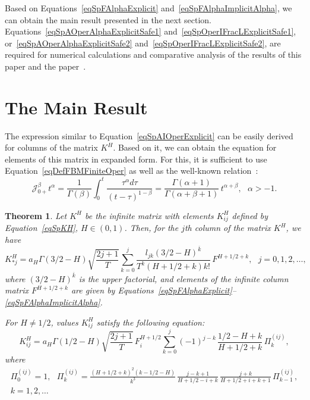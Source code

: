 \documentclass[10pt,reqno]{amsart}
\theoremstyle{plain}
\newtheorem{theorem}{Theorem}
\theoremstyle{remark}
\newcommand{\cj}{\mathcal{J}}
\begin{document}
Based on Equations~\eqref{eqSpFAlphaExplicit} and~\eqref{eqSpFAlphaImplicitAlpha}, we can obtain the main result presented in the next section. Equations~\eqref{eqSpAOperAlphaExplicitSafe1} and~\eqref{eqSpOperIFracLExplicitSafe1}, or~\eqref{eqSpAOperAlphaExplicitSafe2} and~\eqref{eqSpOperIFracLExplicitSafe2}, are required for numerical calculations and comparative analysis of the results of this paper and the paper~\cite{Ryb_Comp25}.



\section{The Main Result}\label{secMain}

The expression similar to Equation~\eqref{eqSpAIOperExplicit} can be easily derived for columns of the matrix $K^H$. Based on it, we can obtain the equation for elements of this matrix in expanded form. For this, it is sufficient to use Equation~\eqref{eqDefFBMFiniteOper} as well as the well-known relation~\cite{SamKilMar_87}:
\begin{equation}\label{eqFracInt}
  \cj_{0+}^\beta t^\alpha = \frac{1}{\Gamma(\beta)} \int_0^t {\frac{\tau^\alpha d\tau}{(t-\tau)^{1-\beta}}} = \frac{\Gamma(\alpha+1)}{\Gamma(\alpha+\beta+1)} \, t^{\alpha+\beta}, \ \ \ \alpha > -1.
\end{equation}

\begin{theorem}\label{thmMain}
Let $K^H$ be the infinite matrix with elements $K_{ij}^H$ defined by Equation~\eqref{eqSpKH}, $H \in (0,1)$. Then, for the $j$th column of the matrix $K^H$, we have
\begin{equation}\label{eqSpOperKHLExplicit}
  K_{*j}^H = a_H \Gamma(3/2-H) \sqrt{\frac{2j+1}{T}} \sum\limits_{k=0}^j \frac{l_{jk} (3/2-H)^{\overline{k}}}{T^k (H+1/2+k) k!} \, F^{H+1/2+k}, \ \ \ j = 0,1,2,\dots,
\end{equation}
where $(3/2-H)^{\overline{k}}$ is the upper factorial, and elements of the infinite column matrix $F^{H+1/2+k}$ are given by Equations~\eqref{eqSpFAlphaExplicit}--\eqref{eqSpFAlphaImplicitAlpha}.

For $H \neq 1/2$, values $K_{ij}^H$ satisfy the following equation:
\begin{equation}\label{eqSpOperKHijExplicit}
  K_{ij}^H = a_H \Gamma(1/2-H) \sqrt{\frac{2j+1}{T}} \, F_i^{H+1/2} \sum\limits_{k=0}^j (-1)^{j-k} \, \frac{1/2-H+k}{H+1/2+k} \, \Pi_k^{(ij)},
\end{equation}
where
\begin{gather*}
  \Pi_0^{(ij)} = 1, \ \ \ \Pi_k^{(ij)} = \frac{(H+1/2+k)^2 (k-1/2-H)}{k^3} \, \frac{j-k+1}{H+1/2-i+k} \, \frac{j+k}{H+1/2+i+k+1} \, \Pi_{k-1}^{(ij)}, \\
  k = 1,2,\dots
\end{gather*}
\end{theorem}
\end{document}
